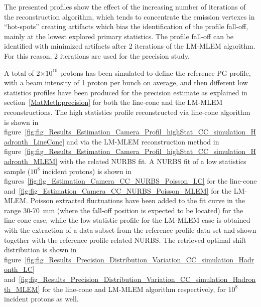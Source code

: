 The presented profiles show the effect of the increasing number of iterations of the reconstruction algorithm, which tends to concentrate the emission vertexes in \enquote{hot-spots} creating artifacts which bias the identification of the profile fall-off, mainly at the lowest explored primary statistics. The profile fall-off can be identified with minimized artifacts after 2 iterations of the LM-MLEM algorithm. For this reason, 2 iterations are used for the precision study.

A total of 2$\times10^{10}$ protons has been simulated to define the reference PG profile, with a beam intensity of 1 proton per bunch on average, and then different low statistics profiles have been produced for the precision estimate as explained in section~\ref{MatMeth:precision} for both the line-cone and the LM-MLEM reconstructions. 
The high statistics profile reconstructed via line-cone algorithm is shown in figure~\ref{fig:fig_Results_Estimation_Camera_Profil_highStat_CC_simulation_Hadronth_LineCone} and via the LM-MLEM reconstruction method in figure~\ref{fig:fig_Results_Estimation_Camera_Profil_highStat_CC_simulation_Hadronth_MLEM} with the related NURBS fit. A NURBS fit of a low statistics sample ($10^8$ incident protons) is shown in figures~\ref{fig:fig_Estimation_Camera_CC_NURBS_Poisson_LC} for the line-cone and~\ref{fig:fig_Estimation_Camera_CC_NURBS_Poisson_MLEM} for the LM-MLEM. Poisson extracted fluctuations have been added to the fit curve in the range 30-70~mm (where the fall-off position is expected to be located) for the line-cone case, while the low statistic profile for the LM-MLEM case is obtained with the extraction of a data subset from the reference profile data set and shown together with the reference profile related NURBS.
The retrieved optimal shift distribution is shown in figure~\ref{fig:fig_Results_Precision_Distribution_Variation_CC_simulation_Hadronth_LC} and~\ref{fig:fig_Results_Precision_Distribution_Variation_CC_simulation_Hadronth_MLEM} for the line-cone and LM-MLEM algorithm respectively, for $10^8$ incident protons as well.


